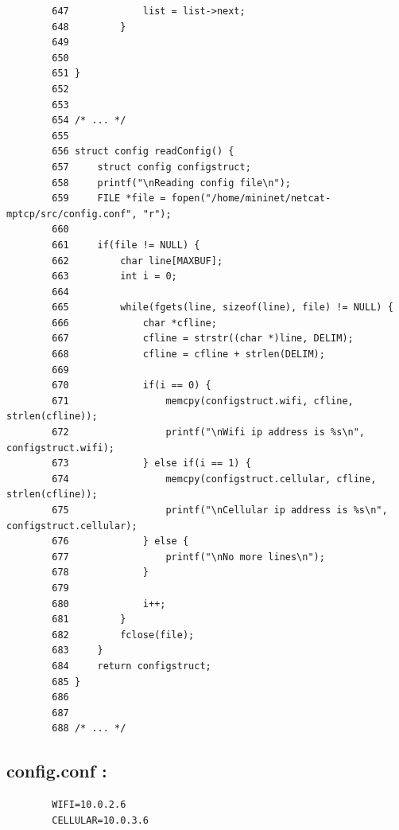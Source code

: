 \documentclass[a4paper,11pt]{article}
\begin{document}
\begin{lstlisting}
		647	            list = list->next;
		648	        }
		649		
		650
		651	}
		652
		653
		654	/* ... */
		655
		656	struct config readConfig() {
		657		struct config configstruct;
		658		printf("\nReading config file\n");
		659		FILE *file = fopen("/home/mininet/netcat-mptcp/src/config.conf", "r");
		660
		661		if(file != NULL) {
		662			char line[MAXBUF];
		663			int i = 0;
		664
		665			while(fgets(line, sizeof(line), file) != NULL) {
		666				char *cfline;
		667				cfline = strstr((char *)line, DELIM);
		668				cfline = cfline + strlen(DELIM);
		669
		670				if(i == 0) {
		671					memcpy(configstruct.wifi, cfline, strlen(cfline));
		672					printf("\nWifi ip address is %s\n", configstruct.wifi);
		673				} else if(i == 1) {
		674					memcpy(configstruct.cellular, cfline, strlen(cfline));
		675					printf("\nCellular ip address is %s\n", configstruct.cellular);
		676				} else {
		677					printf("\nNo more lines\n");
		678				}
		679
		680				i++;
		681			}
		682			fclose(file);
		683		}
		684		return configstruct;
		685	}
		686
		687
		688	/* ... */
		\end{lstlisting}

		\subsection{config.conf :}
	 	\label{subsec:config.conf}
	 	\begin{lstlisting}
	 	WIFI=10.0.2.6
	 	CELLULAR=10.0.3.6
	 	\end{lstlisting}
				
				
				
\end{document}
